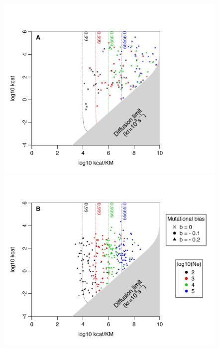 \begin{figure}[h!]
\centering
\begin{minipage}[c]{0.48\linewidth}
\includegraphics[scale=0.56,trim=0cm 0cm 3cm 1.5cm,clip]{pics/SM-Enzymes/2DFitLandscape_Evo_Results_lowF_nobias.jpeg}
\end{minipage} \hspace{-0.5cm}%
\begin{minipage}[c]{0.48\linewidth}
\includegraphics[scale=0.56,trim=1cm 0cm 0.5cm 1.5cm,clip]{pics/SM-Enzymes/2DFitLandscape_Evo_Results_lowF_withbias.jpeg} 

\end{minipage}
\end{figure}
